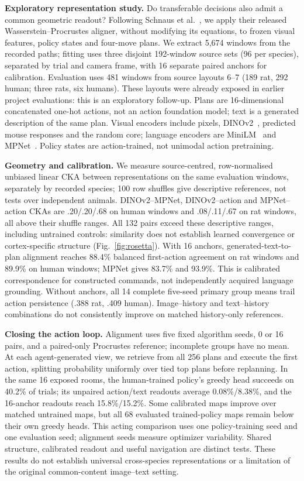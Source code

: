 \documentclass[10pt,onecolumn,letterpaper]{article}
\begin{document}
\textbf{Exploratory representation study.} Do transferable decisions also admit a common geometric readout?
Following Schnaus et al.~\cite{schnaus2026rosetta}, we apply their released Wasserstein--Procrustes aligner,
without modifying its equations, to frozen visual features, policy states and four-move plans.
We extract 5,674 windows from the recorded paths; fitting uses three disjoint 192-window source sets
(96 per species), separated by trial and camera frame, with 16 separate paired anchors for calibration.
Evaluation uses 481 windows from source layouts 6--7 (189 rat, 292 human; three rats, six humans).
These layouts were already exposed in earlier project evaluations: this is an exploratory follow-up.
Plans are 16-dimensional concatenated one-hot actions, not an action foundation model; text is a generated
description of the same plan. Visual encoders include pixels, DINOv2~\cite{oquab2023dinov2}, predicted mouse responses and the random
core; language encoders are MiniLM~\cite{wang2020minilm} and MPNet~\cite{song2020mpnet}. Policy states are action-trained, not unimodal action pretraining.

\textbf{Geometry and calibration.} We measure source-centred, row-normalised unbiased linear CKA between
representations on the same evaluation windows, separately by recorded species; 100 row shuffles give
descriptive references, not tests over independent animals. DINOv2--MPNet, DINOv2--action and MPNet--action
CKAs are .20/.20/.68 on human windows and .08/.11/.67 on rat windows, all above their shuffle ranges.
All 132 pairs exceed these descriptive ranges, including untrained controls: similarity does not establish
learned convergence or cortex-specific structure (Fig.~\ref{fig:rosetta}). With 16 anchors, generated-text-to-plan alignment reaches 88.4\% balanced first-action
agreement on rat windows and 89.9\% on human windows; MPNet gives 83.7\% and 93.9\%. This is calibrated
correspondence for constructed commands, not independently acquired language grounding. Without anchors, all
14 complete five-seed primary group means trail action persistence (.388 rat, .409 human).
Image--history and text--history combinations do not consistently improve on matched history-only references.

\textbf{Closing the action loop.} Alignment uses five fixed algorithm seeds, 0 or 16 pairs, and a paired-only
Procrustes reference; incomplete groups have no mean. At each agent-generated view, we retrieve from all
256 plans and execute the first action, splitting probability uniformly over tied top plans before replanning.
In the same 16 exposed rooms, the human-trained policy's greedy head succeeds on 40.2\% of trials;
its unpaired action/text readouts average 0.08\%/8.38\%, and the 16-anchor readouts reach 15.8\%/15.2\%.
Some calibrated maps improve over matched untrained maps, but all 68 evaluated trained-policy maps remain
below their own greedy heads. This acting comparison uses one policy-training seed and one evaluation seed;
alignment seeds measure optimizer variability. Shared structure, calibrated readout and useful navigation
are distinct tests. These results do not establish universal cross-species representations or a limitation
of the original common-content image--text setting.
\FloatBarrier
\end{document}
